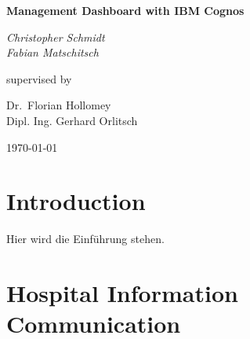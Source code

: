 \documentclass[a4paper]{article}
\begin{document}
	\begin{titlepage}
	
	\centering
	
	{\huge\bfseries Management Dashboard with IBM Cognos\par}
	\vspace{2cm}
	
	
	\begin{figure}
    \hspace{5cm}
	\end{figure}
	\vspace{1.5cm}
	
	{\Large\itshape Christopher Schmidt\\
	Fabian Matschitsch\par}
	\vfill
	supervised by\par
	Dr.~Florian Hollomey\\
	Dipl. Ing. Gerhard Orlitsch
	\vfill
	{\large \today\par}	
	
	\end{titlepage}

	\tableofcontents
	\newpage

	\section{Introduction}
	Hier wird die Einführung stehen.
	\newpage
	
	\section{Hospital Information Communication}
\end{document}
